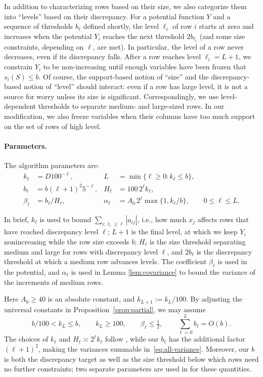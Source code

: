 \documentclass[reqno]{amsart}
\theoremstyle{definition}
\begin{document}
In addition to characterizing rows based on their size, we also categorize them into ``levels'' based on their discrepancy. For a potential function $Y$ and a sequence of thresholds $b_\ell$ defined shortly, the level $\ell_i$ of row $i$ starts at zero and increases when the potential $Y_i$ reaches the next threshold $2b_{\ell_i}$ (and some size constraints, depending on $\ell$, are met). In particular, the level of a row never decreases, even if its discrepancy falls. After a row reaches level $\ell_i=L+1$, we constrain $Y_i$ to be non-increasing until enough variables have been frozen that $s_i(S) \le b$. Of course, the support-based notion of ``size'' and the discrepancy-based notion of ``level'' should interact: even if a row has large level, it is not a source for worry unless its size is significant. Correspondingly, we use level-dependent thresholds to separate medium- and large-sized rows. In our modification, we also freeze variables when their columns have too much support on the set of rows of high level.


\paragraph{Parameters.}

The algorithm parameters are:
\begin{align}
  k_\ell&=D100^{-\ell}, &L&=\min\{\ell\ge0:k_\ell\le b\},\label{eq:walk-par-1}\\
  b_\ell&=b(\ell+1)^2 5^{-\ell}, &H_\ell&=100\,2^\ell k_\ell,\label{eq:walk-par-2}\\
  \beta_\ell&=b_\ell/H_\ell, &\alpha_\ell&=A_0\,2^\ell\max\{1,k_\ell/b\}, \qquad 0\le\ell\le L.\label{eq:walk-par-3}
\end{align}

In brief, $k_\ell$ is used to bound $\sum_{i:\ell_i\ge\ell}|a_{ij}|$, i.e., how much $x_j$ affects rows that have reached discrepancy level $\ell$; $L+1$ is the final level, at which we keep $Y_i$ nonincreasing while the row size exceeds $b$; $H_\ell$ is the size threshold separating medium and large for rows with discrepancy level $\ell$, and $2b_\ell$ is the discrepancy threshold at which a medium row advances levels. The coefficient $\beta_\ell$ is used in the potential, and $\alpha_\ell$ is used in Lemma \ref{lem:covariance} to bound the variance of the increments of medium rows.


Here $A_0\ge40$ is an absolute constant, and $k_{L+1}:=k_L/100$. By adjusting the universal constants in Proposition~\ref{prop:partial}, we may assume
\begin{equation}\label{eq:walk-par-bounds} b/100<k_L\le b,\qquad k_L\ge100,\qquad \beta_\ell\le\tfrac12,\qquad \sum_{\ell=0}^L b_\ell=O(b). \end{equation}
The choices of $k_\ell$ and $H_\ell\asymp2^\ell k_\ell$ follow \cite[Section~5.1]{BJ}, while our $b_\ell$ has the additional factor $(\ell+1)^2$, making the variances summable in~\eqref{eq:all-variance}. Moreover, our $b$ is both the discrepancy target as well as the size threshold below which rows need no further constraints; two separate parameters are used in \cite{BJ} for these quantities.
\end{document}
